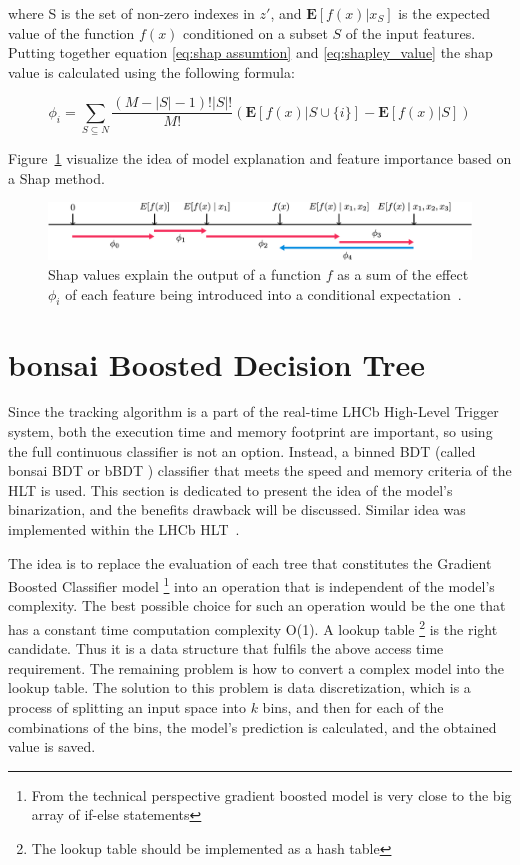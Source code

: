 where S is the set of non-zero indexes in $z'$, and $\mathbf{E}[f(x)|x_S]$ is the expected value of the function $f(x)$ conditioned on a subset $S$ of the input features. Putting together equation \ref{eq:shap assumtion} and \ref{eq:shapley_value} the shap value is calculated using the following formula:

\begin{equation}
        \phi_{i} = \sum_{S \subseteq N} \frac{(M-|S|-1)!|S|!}{M!}(\mathbf{E}[f(x)| S\cup \{i\}] - \mathbf{E}[f(x)|S])
\end{equation}

Figure~\ref{fig:shap_exp} visualize the idea of model explanation and feature importance based on a Shap method. 


\begin{figure}[!h]
\centering
\includegraphics{figures/shap_explanation.png}
\caption{Shap values explain the output of a function $f$ as a sum of the effect $\phi_i$ of each feature being introduced into a conditional expectation~\cite{shap2}. 
\label{fig:shap_exp}}
\end{figure} 


\section{bonsai Boosted Decision Tree}
\label{sec:bbdt}
Since the tracking algorithm is a part of the real-time LHCb High-Level Trigger system, both the execution time and memory footprint are important, so using the full continuous classifier is not an option. Instead, a binned BDT (called bonsai BDT or bBDT ) classifier that meets the speed and memory criteria of the HLT is used. This section is dedicated to present the idea of the model's binarization, and the benefits drawback will be discussed. Similar idea was implemented within the LHCb HLT~\cite{bbdt}.


The idea is to replace the evaluation of each tree that constitutes the Gradient Boosted Classifier model \footnote{From the technical perspective gradient boosted model is very close to the big array of if-else statements} into an operation that is independent of the model's complexity. The best possible choice for such an operation would be the one that has a constant time computation complexity O(1).  A lookup table \footnote{The lookup table should be implemented as a hash table} is the right candidate. Thus it is a data structure that fulfils the above access time requirement. The remaining problem is how to convert a complex model into the lookup table.  The solution to this problem is data discretization, which is a process of splitting an input space into $k$ bins, and then for each of the combinations of the bins, the model's prediction is calculated, and the obtained value is saved. 


